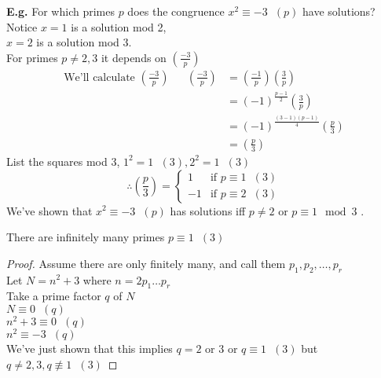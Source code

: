 \documentclass[11pt]{article}
\begin{document}
\textbf{E.g.} For which primes $p$ does the congruence $x^2 \equiv -3 \hspace{7pt} (p)$ have solutions? 
\\[0.5em]
Notice $x=1$ is a solution mod 2,\\
\hspace{30pt} $x=2$ is a solution mod 3.\\

For primes $p \neq 2,3 $ it depends on $(\frac{-3}{p})$\\


\begin{align*}
	\text{We'll calculate $(\frac{-3}{p})$} && (\frac{-3}{p}) &= (\frac{-1}{p})   (\frac{3}{p})\\
	&&&= (-1)^{\frac{p-1}{2}} (\frac{3}{p})\\
	&&&= (-1)^{\frac{(3-1)(p-1)}{4}}(\frac{p}{3})\\
	&&&= (\frac{p}{3})
\end{align*}
List the squares mod 3, $1^2 = 1 \hspace{7pt} (3), 2^2 = 1 \hspace{7pt} (3) $
\begin{equation*}
	\therefore (\frac{p}{3}) = 
	\begin{cases}
		1  &\text{if $p\equiv1 \hspace{7pt} (3)$}\\
		-1 & \text{if $p\equiv 2 \hspace{7pt} (3)$} 
	\end{cases}
\end{equation*}
We've shown that $x^2 \equiv -3\hspace{7pt} (p)$ has solutions iff $p \neq 2 \text{ or } p \equiv 1 \mod 3$ .
\begin{corollary}
	There are infinitely many primes $p \equiv 1 \hspace{7pt} (3)$
\end{corollary}

\begin{proof}
Assume there are only finitely many, and call them $p_1, p_2, \dots, p_r$\\
Let $N = n^2 +3 $ where $n=2p_1\dots p_r$\\
Take a prime factor $q$ of $N$\\[1em]
	$N \equiv 0\hspace{7pt} (q)$\\
	$n^2 + 3 \equiv 0 \hspace{7pt} (q) $\\
	$n^2 \equiv -3 \hspace{7pt}(q)$\\
	We've just shown that this implies $q = 2 $ or 3 or $q \equiv 1\hspace{7pt} (3)$ but $q \neq 2, 3, q \not \equiv 1 \hspace{7pt}(3) $ \lightning 
\end{proof}
\end{document}
